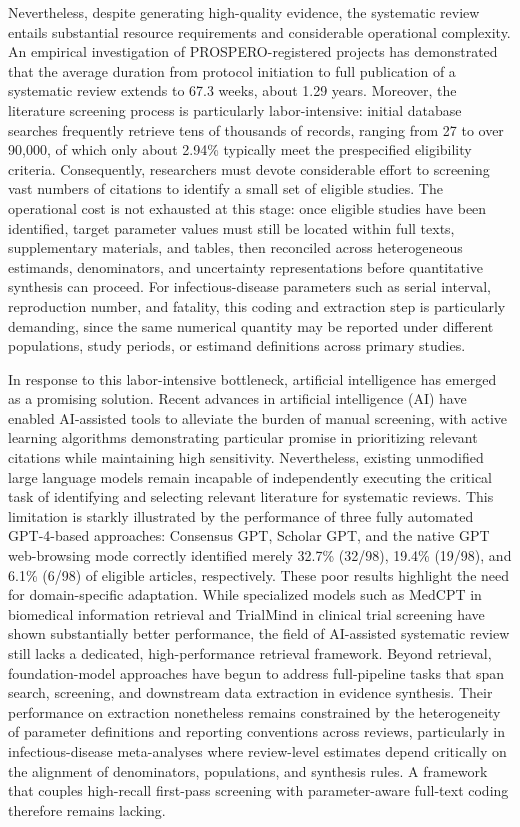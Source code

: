 Nevertheless, despite generating high-quality evidence, the systematic review entails substantial resource requirements and considerable operational complexity. An empirical investigation of PROSPERO-registered projects has demonstrated that the average duration from protocol initiation to full publication of a systematic review extends to 67.3 weeks, about 1.29 years.\cite{ref8} Moreover, the literature screening process is particularly labor-intensive: initial database searches frequently retrieve tens of thousands of records, ranging from 27 to over 90,000, of which only about 2.94\% typically meet the prespecified eligibility criteria.\cite{ref8} Consequently, researchers must devote considerable effort to screening vast numbers of citations to identify a small set of eligible studies. The operational cost is not exhausted at this stage: once eligible studies have been identified, target parameter values must still be located within full texts, supplementary materials, and tables, then reconciled across heterogeneous estimands, denominators, and uncertainty representations before quantitative synthesis can proceed.\cite{ref8,ref9} For infectious-disease parameters such as serial interval, reproduction number, and fatality, this coding and extraction step is particularly demanding, since the same numerical quantity may be reported under different populations, study periods, or estimand definitions across primary studies.

In response to this labor-intensive bottleneck, artificial intelligence has emerged as a promising solution. Recent advances in artificial intelligence (AI) have enabled AI-assisted tools to alleviate the burden of manual screening, with active learning algorithms demonstrating particular promise in prioritizing relevant citations while maintaining high sensitivity.\cite{ref9,ref10,ref11} Nevertheless, existing unmodified large language models remain incapable of independently executing the critical task of identifying and selecting relevant literature for systematic reviews. This limitation is starkly illustrated by the performance of three fully automated GPT-4-based approaches: Consensus GPT, Scholar GPT, and the native GPT web-browsing mode correctly identified merely 32.7\% (32/98), 19.4\% (19/98), and 6.1\% (6/98) of eligible articles, respectively.\cite{ref12} These poor results highlight the need for domain-specific adaptation. While specialized models such as MedCPT in biomedical information retrieval\cite{ref13} and TrialMind in clinical trial screening\cite{ref14} have shown substantially better performance, the field of AI-assisted systematic review still lacks a dedicated, high-performance retrieval framework. Beyond retrieval, foundation-model approaches have begun to address full-pipeline tasks that span search, screening, and downstream data extraction in evidence synthesis.\cite{ref7} Their performance on extraction nonetheless remains constrained by the heterogeneity of parameter definitions and reporting conventions across reviews, particularly in infectious-disease meta-analyses where review-level estimates depend critically on the alignment of denominators, populations, and synthesis rules. A framework that couples high-recall first-pass screening with parameter-aware full-text coding therefore remains lacking.

